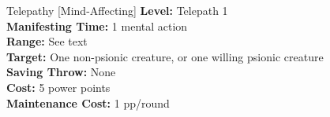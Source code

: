 {Telepathy [Mind-Affecting]}
{
	\textbf{Level:}
	Telepath 1\\
	\textbf{Manifesting Time:}
	1 mental action\\
	\textbf{Range:}
	See text\\
	\textbf{Target:}
	One non-psionic creature, or one willing psionic creature\\
	\textbf{Saving Throw:}
	None\\
	\textbf{Cost:}
	5 power points\\
	\textbf{Maintenance Cost:}
	1 pp/round\\
}
